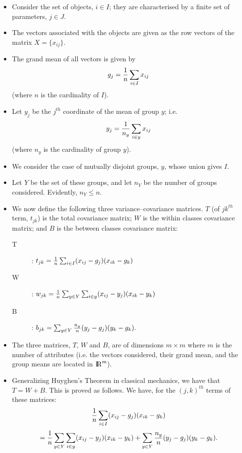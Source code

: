 \documentclass[a4,dvips]{seminar}
\def\real{{\rm I \kern-0.2em R}}       %
\newcommand{\heading}[1]{%
  \begin{center}
    \large\bf
    \shadowbox{#1}%
  \end{center}
  \vspace{1ex minus 1ex}}
\begin{document}
\begin{slide}
\textcolor {reddish} {\heading{Multiple Discriminant Analysis}}
\begin{itemize}
\item Consider the set of objects, $ i \in I $; they are characterised by
a finite set of parameters, $ j \in J$.  
\item The vectors associated with
the objects are given as the row vectors of the matrix $X = \{x_{ij}\}$.
\item The grand mean of all vectors is given by $$ g_{j} = {1 \over n} 
\sum_{i \in I} x_{ij} $$ (where $n$ is the cardinality of $I$).
\item Let $ y_{j} $ be the $j^{th}$ coordinate of the 
mean of group $y$; i.e. $$y_{j} = {1 \over n_y}
\sum_{i \in y} x_{ij} $$ (where $n_y $ is the cardinality of group $y$).
\item We consider the case of mutually disjoint groups, $y$, whose
union gives $I$.  
\item Let $Y$ be the set of these groups, and let $n_Y$ be 
the number of groups considered.  Evidently, $n_Y \leq n$.
\item We now define the following three variance--covariance matrices.
$T$ (of $jk^{th}$ term, $t_{jk}$) is the total covariance matrix;
$W$ is the within classes covariance matrix; and $B$ is the between
classes covariance matrix:
\begin{description}
  \item[T]:
       $ t_{jk} = {1 \over n} \sum_{i \in I} (x_{ij} - g_{j})(x_{ik} -
                                                       g_{k}) $

 \item[W]:
       $ w_{jk} = {1 \over n} \sum_{y \in Y} \sum_{i \in y}
                  (x_{ij} - y_{j})(x_{ik} - y_{k}) $

 \item[B]:
       $ b_{jk} = \sum_{y \in Y} {n_y \over n} (y_{j} - g_{j})
                  (y_{k} - g_{k}) . $

\end{description}
\item The three matrices, $T$, $W$ and $B$, are of dimensions $m \times m$
where $m$ is the number of attributes (i.e. the vectors considered, their
grand mean, and the group means are located in $\real^m$).
\item 
Generalizing Huyghen's Theorem in classical mechanics, we have that 
$T = W + B$. 
This is proved as follows.  We have, for the $(j,k)^{th}$
terms of these matrices:
$$ {1 \over n} \sum_{i \in I} (x_{ij} - g_{j})(x_{ik} - g_{k}) $$
$$ = {1 \over n} \sum_{y \in Y} \sum_{i \in y} (x_{ij} - y_{j})(x_{ik} -
                                                       y_{k})
  + \sum_{y \in Y} {n_y \over n} (y_{j} - g_{j})(y_{k} - g_{k}). $$


\end{itemize}
\end{slide}
\end{document}
